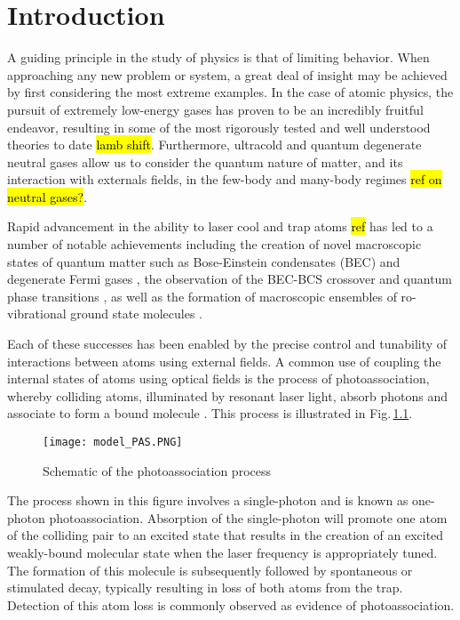 \chapter{Introduction} \label{ch:intro}
A guiding principle in the study of physics is that of limiting behavior.
When approaching any new problem or system, a great deal of insight may be achieved by first considering the most extreme examples.
In the case of atomic physics, the pursuit of extremely low-energy gases has proven to be an incredibly fruitful endeavor, resulting in some of the most rigorously tested and well understood theories to date \hl{lamb shift}.
Furthermore, ultracold and quantum degenerate neutral gases allow us to consider the quantum nature of matter, and its interaction with externals fields, in the few-body and many-body regimes \hl{ref on neutral gases?}.

Rapid advancement in the ability to laser cool and trap atoms \hl{ref} has led to a number of notable achievements including the creation of novel macroscopic states of quantum matter such as Bose-Einstein condensates (BEC) and degenerate Fermi gases \cite{aem95,Bradley1995,dma95,DeMarco1999,zhg03,MartinezdeEscolar2010,Mickelson2010ja,dym10a,stg10}, the observation of the BEC-BCS crossover and quantum phase transitions \cite{rgj04,zss04,cba04Science,Bourdel2004,grj03,Greiner2002,jsg08,Snoke2002,zbb14}, as well as the formation of macroscopic ensembles of ro-vibrational ground state molecules \cite{rtb03,Jones2006, Reinaudi2012,Stellmer2012,nom08,Lang2008}.

Each of these successes has been enabled by the precise control and tunability of interactions between atoms using external fields.
A common use of coupling the internal states of atoms using optical fields is the process of photoassociation, whereby colliding atoms, illuminated by resonant laser light, absorb photons and associate to form a bound molecule \cite{Kohler2006, Jones2006, Chin2010}.
This process is illustrated in Fig.\,\ref{fig:1pasSch}.
\begin{figure} 
	\centerline{
	\texttt{[image: model\_PAS.PNG]}}
	\caption{Schematic of the photoassociation process}{}
	\label{fig:1pasSch}
\end{figure}
The process shown in this figure involves a single-photon and is known as one-photon photoassociation.
Absorption of the single-photon will promote one atom of the colliding pair to an excited state that results in the creation of an excited weakly-bound molecular state when the laser frequency is appropriately tuned.
The formation of this molecule is subsequently followed by spontaneous or stimulated decay, typically resulting in loss of both atoms from the trap.
Detection of this atom loss is commonly observed as evidence of photoassociation.

